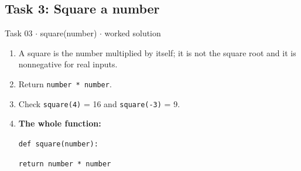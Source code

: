 \documentclass[11pt]{article}
\begin{document}
\begin{keepsection}\subsection{Task 3: Square a number}

\begin{workedbox}{Task 03 \ensuremath{\cdot} square(number) \ensuremath{\cdot} worked solution}
\begin{enumerate}
\item A square is the number multiplied by itself; it is not the square root and it is nonnegative for real inputs.
\item Return \texttt{number * number}.
\item Check \texttt{square(4)} = 16 and \texttt{square(-3)} = 9.
\item {}
\textbf{The whole function:}
\begin{tcolorbox}[colback=Paperblue,colframe=Paperblue,boxrule=0pt,arc=0pt,left=7pt,right=7pt,top=5pt,bottom=5pt]\small\sloppy
\noindent\hspace*{0em}\texttt{def square(number):}\par
\noindent\hspace*{1em}\texttt{return number * number}\par
\end{tcolorbox}
\end{enumerate}
\end{workedbox}

\end{keepsection}
\end{document}

